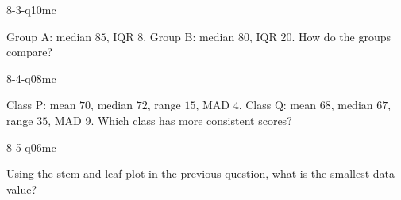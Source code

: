 \begin{practiceQuestion}{8-3-q10}{mc}
\begin{questionText}
Group A: median $85$, IQR $8$. Group B: median $80$, IQR $20$. How do the groups compare?
\end{questionText}
\end{practiceQuestion}

\begin{practiceQuestion}{8-4-q08}{mc}
\begin{questionText}
Class P: mean $70$, median $72$, range $15$, MAD $4$.
Class Q: mean $68$, median $67$, range $35$, MAD $9$.
Which class has more consistent scores?
\end{questionText}
\end{practiceQuestion}

\begin{practiceQuestion}{8-5-q06}{mc}
\begin{questionText}
Using the stem-and-leaf plot in the previous question, what is the smallest data value?
\end{questionText}
\end{practiceQuestion}

